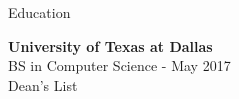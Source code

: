 \documentclass[
	9pt, %
]{resume} %
\begin{document}

\begin{rSection}{Education}

    \textbf{University of Texas at Dallas} \hfill {} \\
    BS in Computer Science - May 2017\\
    Dean's List %

\end{rSection}





\end{document}
